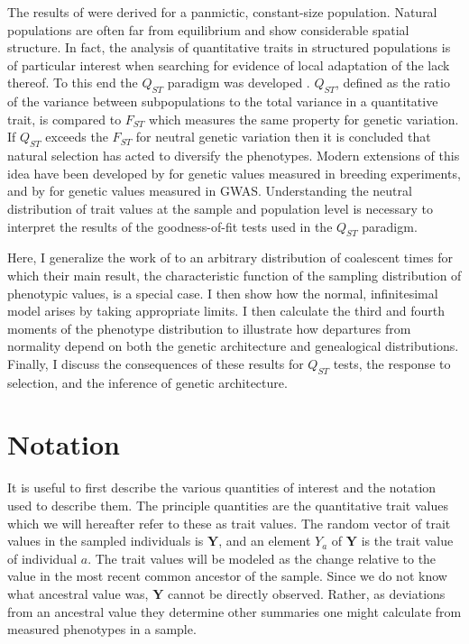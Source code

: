 \documentclass{article}
\begin{document}
The results of \citet{Schraiber2015} were derived for a panmictic, constant-size
population. Natural populations are often far from equilibrium and show
considerable spatial structure. In fact, the analysis of quantitative traits in
structured populations is of particular interest when searching for evidence of
local adaptation of the lack thereof. To this end the $Q_{ST}$ paradigm was
developed \citep{Whitlock2008,Spitze1993}. $Q_{ST}$, defined as the ratio of the
variance between subpopulations to the total variance in a quantitative trait,
is compared to $F_{ST}$ which measures the same property for genetic variation.
If $Q_{ST}$ exceeds the $F_{ST}$ for neutral genetic variation then it is
concluded that natural selection has acted to diversify the phenotypes. Modern
extensions of this idea have been developed by \citet{Ovaskainen2011} for
genetic values measured in breeding experiments, and by \citet{Berg2014} for
genetic values measured in GWAS. Understanding the neutral distribution of trait
values at the sample and population level is necessary to interpret the results
of the goodness-of-fit tests used in the $Q_{ST}$ paradigm. 

Here, I generalize the work of \citet{Schraiber2015} to an arbitrary
distribution of coalescent times for which their main result, the characteristic
function of the sampling distribution of phenotypic values, is a special case. I
then show how the normal, infinitesimal model arises by taking appropriate
limits. I then calculate the third and fourth moments of the phenotype
distribution to illustrate how departures from normality depend on both the
genetic architecture and genealogical distributions. Finally, I discuss the
consequences of these results for $Q_{ST}$ tests, the response to selection, and
the inference of genetic architecture.
\section{Notation}
It is useful to first describe the various quantities of interest and the
notation used to describe them. The principle quantities are the quantitative
trait values which we will hereafter refer to these as trait values. The random
vector of trait values in the sampled individuals is $\mathbf{Y}$, and an
element $Y_a$ of $\mathbf{Y}$ is the trait value of individual $a$. The trait
values will be modeled as the change relative to the value in the most recent
common ancestor of the sample. Since we do not know what ancestral value was,
$\mathbf{Y}$ cannot be directly observed. Rather, as deviations from an
ancestral value they determine other summaries one might calculate from measured
phenotypes in a sample.
\end{document}
